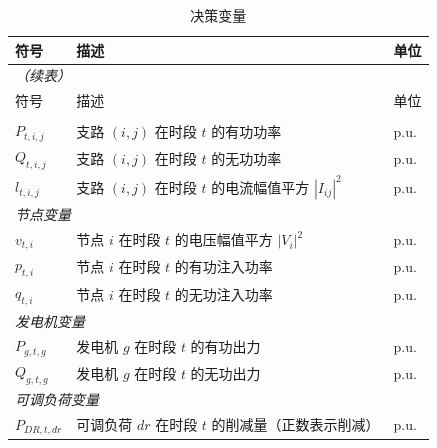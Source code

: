 \documentclass[12pt,a4paper]{article}
\begin{document}
\begin{longtable}{p{3cm}p{6cm}p{3cm}}
\caption{决策变量}\label{tab:decision_vars} \\
\toprule
符号 & 描述 & 单位 \\
\midrule
\endfirsthead
\multicolumn{3}{l}{\small\itshape（续表）} \\
\toprule
符号 & 描述 & 单位 \\
\midrule
\endhead
\bottomrule
\endlastfoot
\multicolumn{3}{l}{\textit{支路变量}} \\
\midrule
$P_{t,i,j}$ & 支路 $(i,j)$ 在时段 $t$ 的有功功率 & p.u. \\
$Q_{t,i,j}$ & 支路 $(i,j)$ 在时段 $t$ 的无功功率 & p.u. \\
$l_{t,i,j}$ & 支路 $(i,j)$ 在时段 $t$ 的电流幅值平方 $|I_{ij}|^2$ & p.u. \\
\midrule
\multicolumn{3}{l}{\textit{节点变量}} \\
\midrule
$v_{t,i}$ & 节点 $i$ 在时段 $t$ 的电压幅值平方 $|V_i|^2$ & p.u. \\
$p_{t,i}$ & 节点 $i$ 在时段 $t$ 的有功注入功率 & p.u. \\
$q_{t,i}$ & 节点 $i$ 在时段 $t$ 的无功注入功率 & p.u. \\
\midrule
\multicolumn{3}{l}{\textit{发电机变量}} \\
\midrule
$P_{g,t,g}$ & 发电机 $g$ 在时段 $t$ 的有功出力 & p.u. \\
$Q_{g,t,g}$ & 发电机 $g$ 在时段 $t$ 的无功出力 & p.u. \\
\midrule
\multicolumn{3}{l}{\textit{可调负荷变量}} \\
\midrule
$P_{DR,t,dr}$ & 可调负荷 $dr$ 在时段 $t$ 的削减量（正数表示削减） & p.u. \\
\end{longtable}
\end{document}
